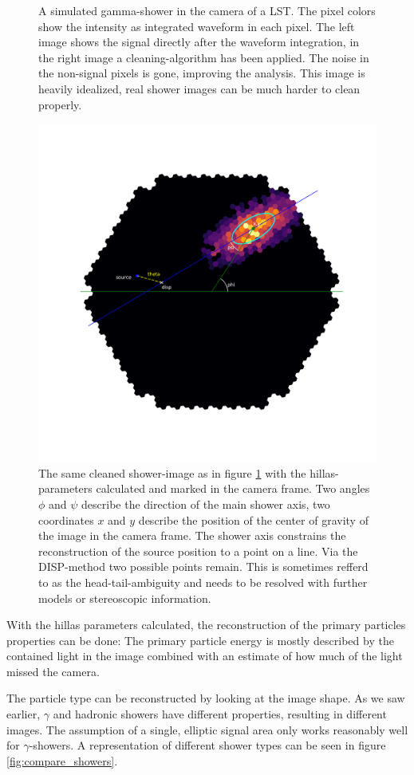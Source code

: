 \begin{figure}
\begin{subfigure}{.4\textwidth}
	\end{subfigure}
	\caption{A simulated gamma-shower in the camera of a LST.
		The pixel colors show the intensity as integrated 
		waveform in each pixel. The left image 
		shows the signal directly after
		the waveform integration, in the right image
		a cleaning-algorithm has been 
		applied. The noise in the non-signal pixels is gone,
		improving the analysis.
		This image is heavily idealized, real shower images 
		can be much harder to clean properly.}
	\label{fig:shower_cleaning}
\end{figure}

\begin{figure}
	\centering
	\includegraphics[width=.6\textwidth]{Plots/hillas_complete.pdf}
	\caption{The same cleaned shower-image as in figure \ref{fig:shower_cleaning}
	with the hillas-parameters calculated and marked in the camera frame.
	Two angles $\phi$ and $\psi$ describe the direction of the 
	main shower axis, two coordinates $x$ and $y$ describe the position of 
	the center of gravity of the image in the camera frame.
	The shower axis constrains the reconstruction of the source position to a 
	point on a line. Via the DISP-method two possible points remain.
	This is sometimes refferd to as the head-tail-ambiguity and needs to be resolved
	with further models or stereoscopic information. 
	}
	\label{fig:hillas_params}
\end{figure}

With the hillas parameters calculated, the reconstruction of the 
primary particles properties can be done:
The primary particle energy is mostly described by the contained light in the image combined with 
an estimate of how much of the light missed the camera. 

The particle type can be reconstructed 
by looking at the image shape.
As we saw earlier, $\gamma$ and hadronic showers have different properties, 
resulting in different images. The assumption of a single, elliptic signal
area only works reasonably well for $\gamma$-showers.
A representation of different shower types can be seen in figure \ref{fig:compare_showers}.

